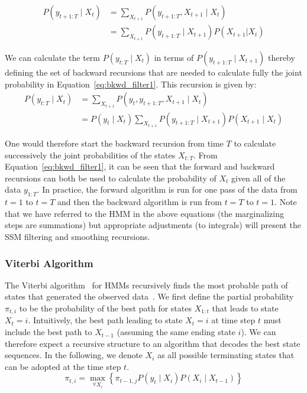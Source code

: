 \begin{equation}\label{eq:bkwd_filter2}
  \begin{split}
    P(y_{t+1:T} \mid X_t) &= \sum_{X_{t+1}} P(y_{t+1:T}, X_{t+1} \mid X_t) \\&= \sum_{X_{t+1}} P(y_{t+1:T} \mid X_{t+1})P(X_{t+1} | X_{t})
  \end{split}
\end{equation}

We can calculate the term $P(y_{t:T} \mid X_{t})$ in terms of $P(y_{t+1:T} \mid X_{t+1})$ thereby defining the set of backward recursions that are needed to calculate fully the joint probability in Equation~\ref{eq:bkwd_filter1}. This recursion is given by:
\begin{equation}\label{eq:bkwd_filter3}
  \begin{split}
    P(y_{t:T} \mid X_t) &= \sum_{X_{t+1}} P(y_t, y_{t+1:T}, X_{t+1} \mid X_t) \\&= P(y_t \mid X_t) \sum_{X_{t+1}} P( y_{t+1:T} \mid X_{t+1} ) P( X_{t+1} \mid X_t )
  \end{split}
\end{equation}

One would therefore start the backward recursion from time $T$ to calculate successively the joint probabilities of the states $X_{t:T}$. From Equation~\ref{eq:bkwd_filter1}, it can be seen that the forward and backward recursions can both be used to calculate the probability of $X_{t}$ given all of the data $y_{1:T}$. In practice, the forward algorithm is run for one pass of the data from $t=1$ to $t=T$ and then the backward algorithm is run from $t=T$ to $t=1$. Note that we have referred to the HMM in the above equations (the marginalizing steps are summations) but appropriate adjustments (to integrals) will present the SSM filtering and smoothing recursions.

\subsubsection{Viterbi Algorithm}\label{sec:viterbi_algorithm}
The Viterbi algorithm~\citep{forney1973viterbi} for HMMs recursively finds the most probable path of states that generated the observed data~\citep{nasrabadi2007pattern}. We first define the partial probability $\pi_{t,i}$ to be the probability of the best path for states $X_{1:t}$ that leads to state $X_t = i$. Intuitively, the best path leading to state $X_t = i$ at time step $t$ must include the best path to $X_{t-1}$ (assuming the same ending state $i$). We can therefore expect a recursive structure to an algorithm that decodes the best state sequences. In the following, we denote $X_i$ as all possible terminating states that can be adopted at the time step $t$.
\begin{equation}\label{eq:viterbi}
  \pi_{t,i} = \max\limits_{\forall X_i} \left\{ \pi_{t-1,j} P(y_t \mid X_i)P(X_i \mid X_{t-1}) \right\}
\end{equation}

